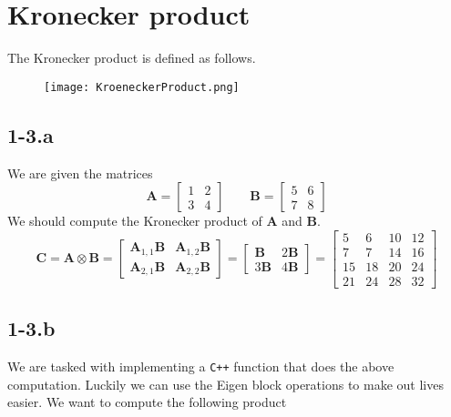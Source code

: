 \documentclass{article}
\begin{document}
\section*{Kronecker product}
The Kronecker product is defined as follows.
\begin{figure}[!hbt]
    \centering
\texttt{[image: KroeneckerProduct.png]}
\end{figure}
\subsection*{1-3.a} We are given the matrices
\begin{equation*}
    \mathbf{A} = \begin{bmatrix}
        1 & 2 \\ 3 & 4
    \end{bmatrix} \qquad \mathbf{B} = \begin{bmatrix}
        5 & 6 \\ 7 & 8
    \end{bmatrix}
\end{equation*}
We should compute the Kronecker product of $\mathbf{A}$ and $\mathbf{B}$.
\begin{equation*}
    \mathbf{C} = \mathbf{A} \otimes \mathbf{B} = 
    \begin{bmatrix}
    \mathbf{A}_{1,1}\mathbf{B} & \mathbf{A}_{1,2}\mathbf{B} \\
    \mathbf{A}_{2,1}\mathbf{B} & \mathbf{A}_{2,2}\mathbf{B}
    \end{bmatrix} = 
    \begin{bmatrix}
    \mathbf{B} & 2\mathbf{B} \\
    3\mathbf{B} & 4\mathbf{B}
    \end{bmatrix} = 
    \begin{bmatrix}
     5 & 6 & 10 & 12 \\
     7 & 7 & 14 & 16 \\
     15 & 18 & 20 & 24 \\
     21 & 24 & 28 & 32
    \end{bmatrix}
\end{equation*}
\subsection*{1-3.b} We are tasked with implementing a \verb|C++| function that does the above computation. Luckily we can use the Eigen block operations to make out lives easier. We want to compute the following product
\end{document}
